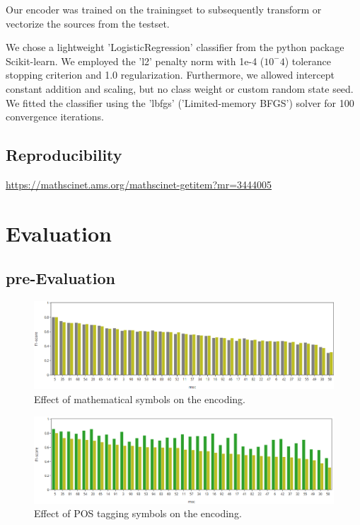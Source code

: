 Our encoder was trained on the trainingset to subsequently transform or vectorize the sources from the testset.

We chose a lightweight 'LogisticRegression' classifier from the python package Scikit-learn. We employed the 'l2' penalty norm with 1e-4 ($10^-4$) tolerance stopping criterion and 1.0 regularization. Furthermore, we allowed intercept constant addition and scaling, but no class weight or custom random state seed. We fitted the classifier using the 'lbfgs' ('Limited-memory BFGS') solver for 100 convergence iterations.
\subsection{Reproducibility}
\url{https://mathscinet.ams.org/mathscinet-getitem?mr=3444005}

\section{Evaluation}\label{sec:eval}

\subsection{pre-Evaluation}

\begin{figure}[h]
  \centering
  \includegraphics[width=1.1\textwidth]{mathEncoding.png}
  \caption{Effect of mathematical symbols on the encoding.}
\end{figure}

\begin{figure}[h]
  \centering
  \includegraphics[width=1.1\textwidth]{POSeffekt.png}
  \caption{Effect of POS tagging symbols on the encoding.}
\end{figure}

